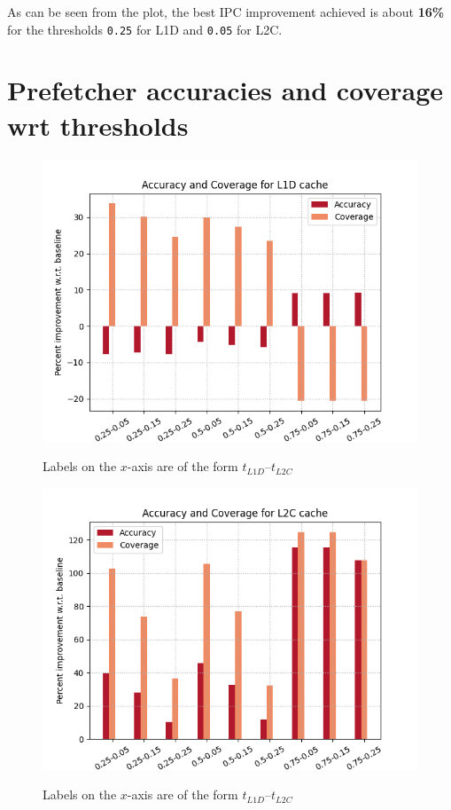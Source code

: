 \documentclass[11pt, swedish, openany]{book}
\begin{document}
As can be seen from the plot, the best IPC improvement achieved is about \textbf{16\%} for the thresholds \texttt{0.25} for L1D and \texttt{0.05} for L2C.

\section{Prefetcher accuracies and coverage wrt thresholds}
\label{section:ac}

\begin{figure}[H]
    \centering
    {\includegraphics[scale = 0.7]{images/combined_L1D.png}}
    \caption{Labels on the $x$-axis are of the form $t_{L1D}$--$t_{L2C}$}
    \label{fig:cl1d}
\end{figure}

\begin{figure}[H]
    \centering
    {\includegraphics[scale = 0.7]{images/combined_L2C.png}}
    \caption{Labels on the $x$-axis are of the form $t_{L1D}$--$t_{L2C}$}
    \label{fig:cl2c}
\end{figure}
\end{document}
